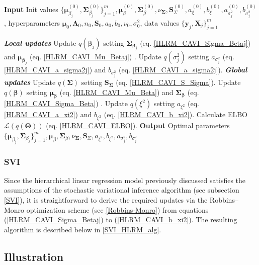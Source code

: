 \begin{algorithm}[H]
\caption{CAVI for HLRM}
\label{CAVI_HLRM_alg}
\begin{algorithmic}
\State \textbf{Input} Init values $\{\bm{\mu}_{\beta_j}^{(0)}, \bm{\Sigma}_{\beta_j}^{(0)}\}_{j=1}^m,\bm{\mu}_\beta^{(0)},\bm{\Sigma}_\beta^{(0)},\nu_{\bm{\Sigma}},\bm{S}_\Sigma^{(0)},a_\xi^{(0)}, b_\xi^{(0)},a_{\sigma_j^2}^{(0)}, b_{\sigma_j^2}^{(0)}$, hyperparameters $\bm{\mu}_0,\bm{\Lambda}_0,n_0,\bm{S}_0,a_0,b_0,\nu_0,\sigma_0^2$, data values $\{\bm{y}_j,\bm{X}_j\}_{j=1}^m$

  \State \textbf{\textit{Local updates}}
    \State Update $q (\bm{\beta}_j)$ setting $\bm{\Sigma}_{\bm{\beta}_j}$ (eq. \ref{HLRM_CAVI_Sigma_Betaj})  and $\bm{\mu}_{\bm{\beta}_j}$ (eq. \ref{HLRM_CAVI_Mu_Betaj}) .
\State Update $q(\sigma^2_j)$ setting $a_{\sigma_j^2}$ (eq. \ref{HLRM_CAVI_a_sigma2j}) and $b_{\sigma_j^2}$ (eq. \ref{HLRM_CAVI_a_sigma2j}).
  \EndFor
  \State \textbf{\textit{Global updates}}
    \State Update $q (\bm{\Sigma})$ setting $\bm{S}_{\bm{\Sigma}}$ (eq. \ref{HLRM_CAVI_S_Sigma}).
  \State Update $q (\bm{\beta})$ setting $\bm{\mu}_{\bm{\beta}}$ (eq. \ref{HLRM_CAVI_Mu_Beta}) and $\bm{\Sigma}_{\bm{\beta}}$ (eq. \ref{HLRM_CAVI_Sigma_Beta}) .
  \State Update $q (\xi^2)$ setting $a_{\xi^2}$ (eq. \ref{HLRM_CAVI_a_xi2}) and $b_{\xi^2}$ (eq. \ref{HLRM_CAVI_b_xi2}).
\State Calculate ELBO $\mathcal{L}(q(\bm{\Theta}))$ (eq. \ref{HLRM_CAVI_ELBO}).
\EndWhile
\State \textbf{Output} Optimal parameters $\{\bm{\mu}_{\beta_j}, \bm{\Sigma}_{\beta_j}\}_{j=1}^m,\bm{\mu}_\beta,\bm{\Sigma}_\beta,\nu_{\bm{\Sigma}},\bm{S}_\Sigma,a_{\xi^2}, b_{\xi^2},a_{\sigma_j^2}, b_{\sigma_j^2}$
\end{algorithmic}
\end{algorithm}

\subsubsection{SVI}

Since the hierarchical linear regression model  previously discussed satisfies the assumptions of
the stochastic variational inference algorithm (see subsection \ref{SVI}), it is straightforward to derive the required
updates via the Robbins–Monro optimization scheme (see \ref{Robbins-Monro}) from equations (\ref{HLRM_CAVI_Sigma_Betaj}) to (\ref{HLRM_CAVI_b_xi2}). The resulting algorithm is described below in \ref{SVI_HLRM_alg}.

\subsection{Illustration}
